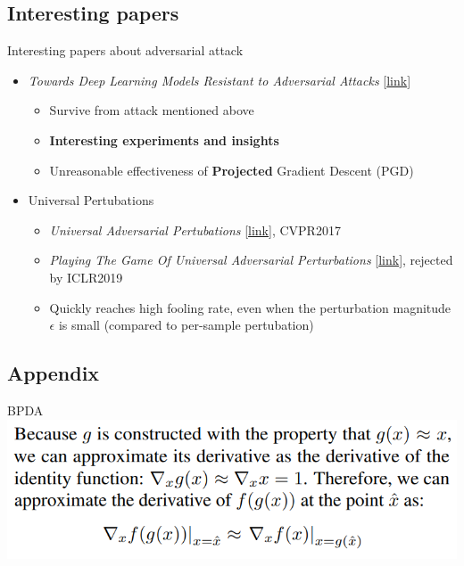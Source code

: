 \documentclass{beamer}
\begin{document}
\subsection{Interesting papers}
\begin{frame}{Interesting papers about adversarial attack}
  \begin{itemize}
    \item \textit{Towards Deep Learning Models Resistant to Adversarial Attacks} [\href{https://arxiv.org/abs/1706.06083}{link}]
      \begin{itemize}
        \item Survive from attack mentioned above
        \item \textbf{Interesting experiments and insights}
        \item Unreasonable effectiveness of \textbf{Projected} Gradient Descent (PGD)
      \end{itemize}
    \item Universal Pertubations
      \begin{itemize}
        \item \textit{Universal Adversarial Pertubations} [\href{https://arxiv.org/pdf/1610.08401.pdf}{link}], CVPR2017
        \item \textit{Playing The Game Of Universal Adversarial Perturbations} [\href{https://arxiv.org/abs/1809.07802}{link}], rejected by ICLR2019
        \item Quickly reaches high fooling rate, even when the perturbation magnitude $\epsilon$ is small (compared to per-sample pertubation)
      \end{itemize}
  \end{itemize}
\end{frame}

\subsection{Appendix}
\begin{frame}{BPDA}
  \includegraphics[width=\textwidth]{fig/ob-grad/bpda-fact.png}
\end{frame}
\end{document}
